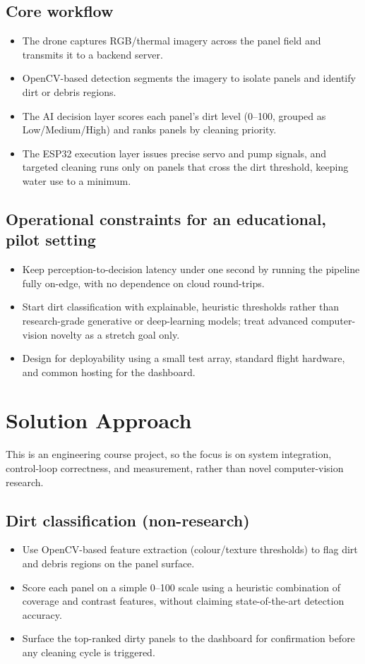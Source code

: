 \documentclass[11pt]{article}
\begin{document}
\subsection{Core workflow}
\begin{itemize}
    \item The drone captures RGB/thermal imagery across the panel field and transmits it to a backend server.
    \item OpenCV-based detection segments the imagery to isolate panels and identify dirt or debris regions.
    \item The AI decision layer scores each panel's dirt level (0--100, grouped as Low/Medium/High) and ranks panels by cleaning priority.
    \item The ESP32 execution layer issues precise servo and pump signals, and targeted cleaning runs only on panels that cross the dirt threshold, keeping water use to a minimum.
\end{itemize}

\subsection{Operational constraints for an educational, pilot setting}
\begin{itemize}
    \item Keep perception-to-decision latency under one second by running the pipeline fully on-edge, with no dependence on cloud round-trips.
    \item Start dirt classification with explainable, heuristic thresholds rather than research-grade generative or deep-learning models; treat advanced computer-vision novelty as a stretch goal only.
    \item Design for deployability using a small test array, standard flight hardware, and common hosting for the dashboard.
\end{itemize}

\section{Solution Approach}
This is an engineering course project, so the focus is on system integration, control-loop correctness, and measurement, rather than novel computer-vision research.

\subsection{Dirt classification (non-research)}
\begin{itemize}
    \item Use OpenCV-based feature extraction (colour/texture thresholds) to flag dirt and debris regions on the panel surface.
    \item Score each panel on a simple 0--100 scale using a heuristic combination of coverage and contrast features, without claiming state-of-the-art detection accuracy.
    \item Surface the top-ranked dirty panels to the dashboard for confirmation before any cleaning cycle is triggered.
\end{itemize}
\end{document}

